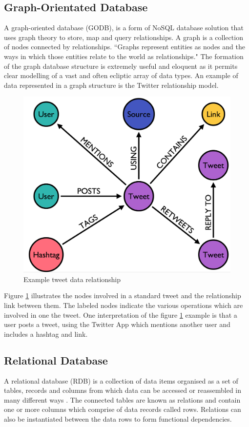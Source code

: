 \subsection{Graph-Orientated Database}
A graph-oriented database (GODB), is a form of NoSQL database solution that uses graph theory to store, map and query relationships. A graph is a collection of nodes connected by relationships. ``Graphs represent entities as nodes and the ways in which those entities relate to the world as relationships."  \cite{gd} The formation of the graph database structure is extremely useful and eloquent as it permits clear modelling of a vast and often ecliptic array of data types.  \cite{gd} An example of data represented in a graph structure is the Twitter relationship model. \begin{figure}[h]\begin{center}\includegraphics[width=0.5\linewidth]{images/graphdb_twitter}\caption{Example tweet data relationship}\label{fig:twitter}\end{center}\end{figure} Figure \ref{fig:twitter} illustrates the nodes involved in a standard tweet and the relationship link between them. The labeled nodes indicate the various operations which are involved in one the tweet. One interpretation of the figure \ref{fig:twitter} example is that a user posts a tweet, using the Twitter App which mentions another user and includes a hashtag and link.

\subsection{Relational Database}
A relational database (RDB) is a collection of data items organised as a set of tables, records and columns from which data can be accessed or reassembled in many different ways \cite{rdb}. The connected tables are known as relations and contain one or more columns which comprise of data records called rows. Relations can also be instantiated between the data rows to form functional dependencies.

